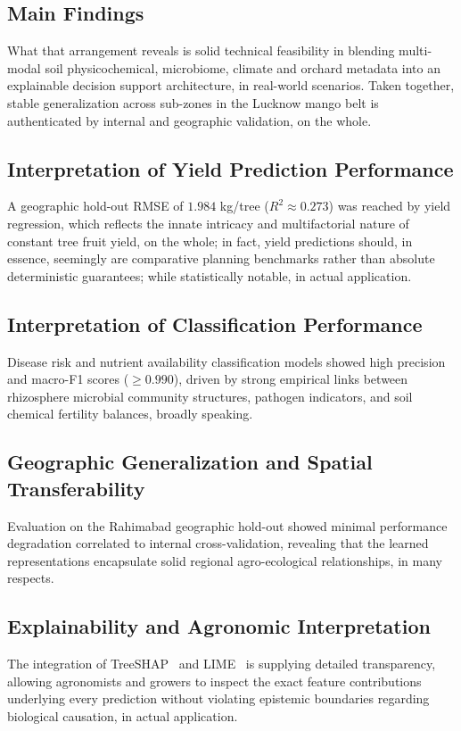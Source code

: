 \documentclass[runningheads,a4paper,oribibl]{llncs}
\begin{document}
\subsection{Main Findings}
What that arrangement reveals is solid technical feasibility in blending multi-modal soil physicochemical, microbiome, climate and orchard metadata into an explainable decision support architecture, in real-world scenarios. Taken together, stable generalization across sub-zones in the Lucknow mango belt is authenticated by internal and geographic validation, on the whole.

\subsection{Interpretation of Yield Prediction Performance}
A geographic hold-out RMSE of $1.984$ kg/tree ($R^2 \approx 0.273$) was reached by yield regression, which reflects the innate intricacy and multifactorial nature of constant tree fruit yield\cite{chlingaryan2018,vanklompenburg2020}, on the whole; in fact, yield predictions should, in essence, seemingly are comparative planning benchmarks rather than absolute deterministic guarantees; while statistically notable, in actual application.

\subsection{Interpretation of Classification Performance}
Disease risk and nutrient availability classification models showed high precision and macro-F1 scores ($\ge 0.990$), driven by strong empirical links between rhizosphere microbial community structures, pathogen indicators, and soil chemical fertility balances, broadly speaking.

\subsection{Geographic Generalization and Spatial Transferability}
Evaluation on the Rahimabad geographic hold-out showed minimal performance degradation correlated to internal cross-validation, revealing that the learned representations encapsulate solid regional agro-ecological relationships, in many respects.

\subsection{Explainability and Agronomic Interpretation}
The integration of TreeSHAP~\cite{lundberg2017} and LIME~\cite{ribeiro2016} is supplying detailed transparency, allowing agronomists and growers to inspect the exact feature contributions underlying every prediction without violating epistemic boundaries regarding biological causation, in actual application.
\end{document}
